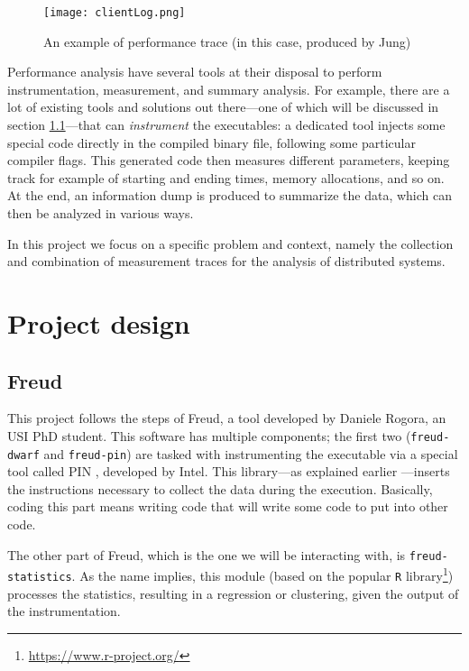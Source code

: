 \documentclass[11pt,english,singlespacing,headsepline,consistentlayout]{auxiliary/si-msc-thesis}
\begin{document}
\begin{figure}[htb]
  \centering
  \texttt{[image: clientLog.png]}
  \caption{An example of performance trace (in this case, produced by Jung)}
  \label{fig:clientLog}
\end{figure}
%
Performance analysis have several tools at their disposal to perform
instrumentation, measurement, and summary analysis. For example, there
are a lot of existing tools and solutions out there---one of which
will be discussed in section \ref{sec:freud}---that can
\emph{instrument} the executables: a dedicated tool injects some
special code directly in the compiled binary file, following some
particular compiler flags. This generated code then measures different
parameters, keeping track for example of starting and ending times,
memory allocations, and so on.  At the end, an information dump is
produced to summarize the data, which can then be analyzed in various
ways.

In this project we focus on a specific problem and context, namely the
collection and combination of measurement traces for the analysis of
distributed systems.


\chapter{Project design}

\section{Freud}\label{sec:freud}


This project follows the steps of Freud, a tool developed by Daniele
Rogora, an USI PhD student.  This software has multiple components;
the first two (\texttt{freud-dwarf} and \texttt{freud-pin}) are tasked
with instrumenting the executable via a special tool called PIN
\cite{PIN}, developed by Intel. This library---as explained earlier
---inserts the instructions necessary to collect the data during the
execution. Basically, coding this part means writing code that will
write some code to put into other code.

The other part of Freud, which is the one we will be interacting with, is \texttt{freud-statistics}.
As the name implies, this module (based on the popular \texttt{R} library\footnote{\url{https://www.r-project.org/}})
processes the statistics, resulting in a regression or clustering, given the output of the instrumentation.
\end{document}
